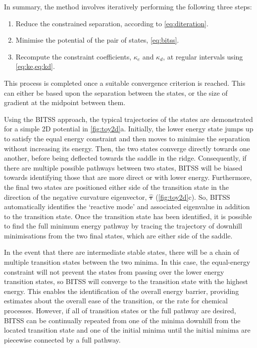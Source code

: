 \documentclass[twocolumn,10pt]{revtex4}
\begin{document}
In summary, the method involves iteratively performing the following three steps:
\begin{enumerate}
  \item Reduce the constrained separation, according to \cref{eq:diteration}.
  \item Minimise the potential of the pair of states, \cref{eq:bitss}.
  \item Recompute the constraint coefficients, $\kappa_e$ and $\kappa_d$, at regular intervals using \cref{eq:ke,eq:kd}.
\end{enumerate}
This process is completed once a suitable convergence criterion is reached.
This can either be based upon the separation between the states, or the size of gradient at the midpoint between them.

Using the BITSS approach, the typical trajectories of the states are demonstrated for a simple 2D potential in \cref{fig:toy2d}a.
Initially, the lower energy state jumps up to satisfy the equal energy constraint and then moves to minimise the separation without increasing its energy.
Then, the two states converge directly towards one another, before being deflected towards the saddle in the ridge.
Consequently, if there are multiple possible pathways between two states, BITSS will be biased towards identifying those that are more direct or with lower energy.
Furthermore, the final two states are positioned either side of the transition state in the direction of the negative curvature eigenvector, $\bm{\hat{\tau}}$ (\cref{fig:toy2d}c).
So, BITSS automatically identifies the `reactive mode' and associated eigenvalue in addition to the transition state.
Once the transition state has been identified, it is possible to find the full minimum energy pathway by tracing the trajectory of downhill minimisations from the two final states, which are either side of the saddle.

In the event that there are intermediate stable states, there will be a chain of multiple transition states between the two minima.
In this case, the equal-energy constraint will not prevent the states from passing over the lower energy transition states, so BITSS will converge to the transition state with the highest energy.
This enables the identification of the overall energy barrier, providing estimates about the overall ease of the transition, or the rate for chemical processes.
However, if all of transition states or the full pathway are desired, BITSS can be continually repeated from one of the minima downhill from the located transition state and one of the initial minima until the initial minima are piecewise connected by a full pathway.
\end{document}
